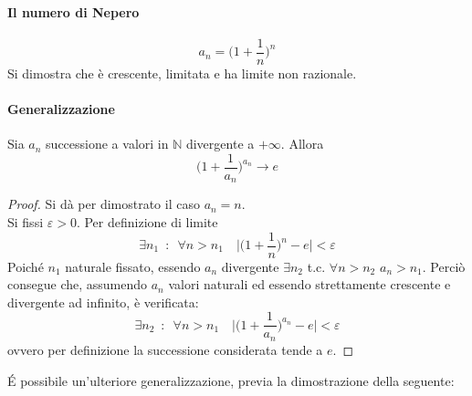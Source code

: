 \documentclass[10pt]{article}
\theoremstyle{plain}
\begin{document}
\paragraph*{Il numero di Nepero}
\[a_n = \bigg(1 + \frac{1}{n}\bigg)^n\]
Si dimostra che è crescente, limitata e ha limite non razionale.

\paragraph*{Generalizzazione}
\begin{prop}
    Sia $a_n$ successione a valori in $\mathbb{N}$ divergente a $+\infty$. Allora
    \[\bigg(1 + \frac{1}{a_n}\bigg)^{a_n} \longrightarrow e\]
\end{prop}
\begin{proof}
    Si dà per dimostrato il caso $a_n = n$.
    \\Si fissi $\varepsilon > 0$. Per definizione di limite \[\exists n_1 \enspace : \enspace \forall n > n_1 \quad \bigg| \bigg(1 + \frac{1}{n}\bigg)^n - e\bigg| < \varepsilon\]
    Poiché $n_1$ naturale fissato, essendo $a_n$ divergente $\exists n_2$ t.c. $\forall n > n_2$ $a_n > n_1$. Perciò consegue che, assumendo $a_n$ valori naturali ed essendo strettamente crescente e divergente ad infinito, è verificata:
    \[\exists n_2 \enspace : \enspace \forall n > n_1 \quad \bigg| \bigg(1 + \frac{1}{a_n}\bigg)^{a_n} - e\bigg| < \varepsilon\]
    ovvero per definizione la successione considerata tende a $e$.
\end{proof}

\'E possibile un'ulteriore generalizzazione, previa la dimostrazione della seguente:
\end{document}
